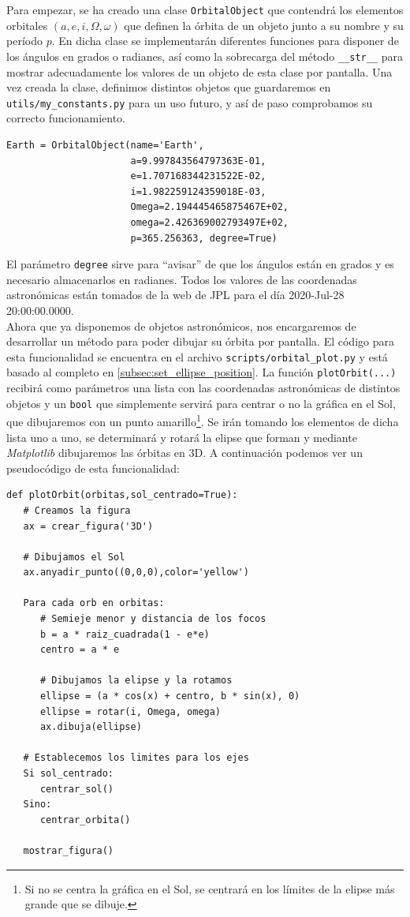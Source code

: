 \documentclass[11pt]{book}
\begin{document}
Para empezar, se ha creado una clase \texttt{OrbitalObject} que contendrá los elementos orbitales $(a,e,i,\Omega,\omega)$ que definen la órbita de un objeto junto a su nombre y su período $p$. En dicha clase se implementarán diferentes funciones para disponer de los ángulos en grados o radianes, así como la sobrecarga del método \texttt{\_\_str\_\_} para mostrar adecuadamente los valores de un objeto de esta clase por pantalla. Una vez creada la clase, definimos distintos objetos que guardaremos en \texttt{utils/my\_constants.py} para un uso futuro, y así de paso comprobamos su correcto funcionamiento.\\
\begin{lstlisting}[style=PythonCode]
Earth = OrbitalObject(name='Earth',
                      a=9.997843564797363E-01,
                      e=1.707168344231522E-02,
                      i=1.982259124359018E-03,
                      Omega=2.194445465875467E+02,
                      omega=2.426369002793497E+02,
                      p=365.256363, degree=True)
\end{lstlisting}

El parámetro \texttt{degree} sirve para ``avisar'' de que los ángulos están en grados y es necesario almacenarlos en radianes. Todos los valores de las coordenadas astronómicas están tomados de la web de JPL \cite{jpl} para el día 2020-Jul-28 20:00:00.0000.\\

Ahora que ya disponemos de objetos astronómicos, nos encargaremos de desarrollar un método para poder dibujar su órbita por pantalla. El código para esta funcionalidad se encuentra en el archivo \texttt{scripts/orbital\_plot.py} y está basado al completo en \ref{subsec:set_ellipse_position}. La función \texttt{plotOrbit(...)} recibirá como parámetros una lista con las coordenadas astronómicas de distintos objetos y un \texttt{bool} que simplemente servirá para centrar o no la gráfica en el Sol, que dibujaremos con un punto amarillo\footnote{Si no se centra la gráfica en el Sol, se centrará en los límites de la elipse más grande que se dibuje.}. Se irán tomando los elementos de dicha lista uno a uno, se determinará y rotará la elipse que forman y mediante \textit{Matplotlib} dibujaremos las órbitas en 3D. A continuación podemos ver un pseudocódigo de esta funcionalidad:
\begin{lstlisting}[style=PythonCode]
def plotOrbit(orbitas,sol_centrado=True):
   # Creamos la figura
   ax = crear_figura('3D')
   
   # Dibujamos el Sol
   ax.anyadir_punto((0,0,0),color='yellow')
   
   Para cada orb en orbitas:
      # Semieje menor y distancia de los focos
      b = a * raiz_cuadrada(1 - e*e)
      centro = a * e
      
      # Dibujamos la elipse y la rotamos
      ellipse = (a * cos(x) + centro, b * sin(x), 0)
      ellipse = rotar(i, Omega, omega)
      ax.dibuja(ellipse)
   
   # Establecemos los limites para los ejes
   Si sol_centrado:
      centrar_sol()
   Sino:
      centrar_orbita()
      
   mostrar_figura()
\end{lstlisting}
\end{document}

